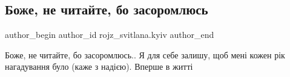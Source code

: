  
 
 
 
 
 
\subsection{Боже, не читайте, бо засоромлюсь}
\label{sec:27_02_2022.fb.rojz_svitlana.kyiv.3.bozhe_ne_chytajte}
 
\ifcmt
 author_begin
   author_id rojz_svitlana.kyiv
 author_end
\fi

Боже, не читайте, бо засоромлюсь.. Я для себе залишу, щоб мені кожен рік
нагадування було (каже з надією). Вперше в житті 🙂

